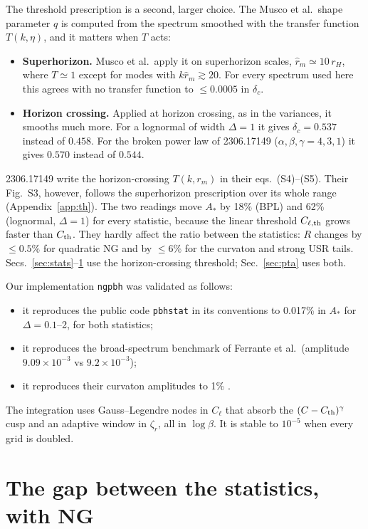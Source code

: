 \documentclass[11pt,a4paper]{article}
\newcommand{\Cl}{C_{\ell}}
\newcommand{\zr}{\zeta_r}
\begin{document}
The threshold prescription is a second, larger choice. The Musco et al.\ shape parameter $q$
\cite{Musco21} is computed from the spectrum smoothed with the transfer function $T(k,\eta)$, and
it matters when $T$ acts:
\begin{itemize}
\item \textbf{Superhorizon.} Musco et al.\ apply it on superhorizon scales,
$\hat r_m\simeq10\,r_H$, where $T\simeq1$ except for modes with $k\hat r_m\gtrsim20$. For every
spectrum used here this agrees with no transfer function to $\le0.0005$ in $\delta_c$.
\item \textbf{Horizon crossing.} Applied at horizon crossing, as in the variances, it smooths much
more. For a lognormal of width $\Delta=1$ it gives $\delta_c=0.537$ instead of $0.458$. For the
broken power law of 2306.17149 ($\alpha,\beta,\gamma=4,3,1$) it gives $0.570$ instead of $0.544$.
\end{itemize}
2306.17149 write the horizon-crossing $T(k,r_m)$ in their eqs.~(S4)--(S5). Their Fig.~S3,
however, follows the superhorizon prescription over its whole range (Appendix~\ref{app:th}). The
two readings move $A_*$ by 18\% (BPL) and 62\% (lognormal, $\Delta=1$) for every statistic,
because the linear threshold $C_{\ell,\rm th}$ grows faster than $C_{\rm th}$. They hardly affect
the ratio between the statistics: $R$ changes by $\le0.5\%$ for quadratic NG and by $\le6\%$ for
the curvaton and strong USR tails. Secs.~\ref{sec:stats}--\ref{sec:R} use the horizon-crossing
threshold; Sec.~\ref{sec:pta} uses both.

Our implementation \texttt{ngpbh} was validated as follows:
\begin{itemize}
\item it reproduces the public code \texttt{pbhstat} \cite{ColeFumagalli} in its conventions to
0.017\% in $A_*$ for $\Delta=0.1$--2, for both statistics;
\item it reproduces the broad-spectrum benchmark of Ferrante et al.\ (amplitude
$9.09\times10^{-3}$ vs $9.2\times10^{-3}$);
\item it reproduces their curvaton amplitudes to 1\% \cite{Ferrante}.
\end{itemize}
The integration uses Gauss--Legendre nodes in $\Cl$ that absorb the $(C-C_{\rm th})^\gamma$
cusp and an adaptive window in $\zr$, all in $\log\beta$. It is stable to $10^{-5}$ when every
grid is doubled.

\section{The gap between the statistics, with NG}\label{sec:R}
\end{document}
